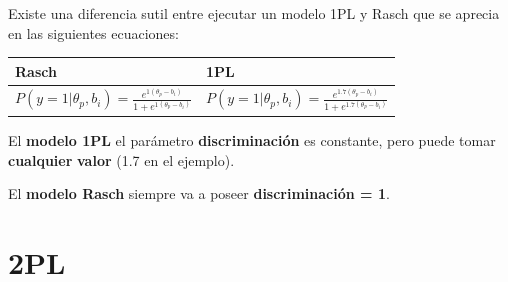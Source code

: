 \documentclass[
  letterpaper,
  DIV=11,
  numbers=noendperiod]{scrreprt}
\begin{document}
Existe una diferencia sutil entre ejecutar un modelo 1PL y Rasch que se
aprecia en las siguientes ecuaciones:

\begin{longtable}[]{@{}
  >{\centering\arraybackslash}p{}
  >{\centering\arraybackslash}p{}@{}}
\toprule\noalign{}
\begin{minipage}[b]{\linewidth}\centering
Rasch
\end{minipage} & \begin{minipage}[b]{\linewidth}\centering
1PL
\end{minipage} \\
\midrule\noalign{}
\endhead
\bottomrule\noalign{}
\endlastfoot
\(                                     
   P(y = 1|\theta_p,b_i) = \frac{e^{1(\theta_p-b_i)}}{1+e^{1(\theta_p-b_i)}} 
                                      \) &
\(                                                                        P(y = 1|\theta_p,b_i) = \frac{e^{1.7(\theta_p-b_i)}}{1+e^{1.7(\theta_p-b_i)}}                                                                          \) \\
\end{longtable}

El \textbf{modelo 1PL} el parámetro \textbf{discriminación} es
constante, pero puede tomar \textbf{cualquier} \textbf{valor} (1.7 en el
ejemplo).

El \textbf{modelo Rasch} siempre va a poseer \textbf{discriminación =
1}.

\section{2PL}\label{pl}
\end{document}
